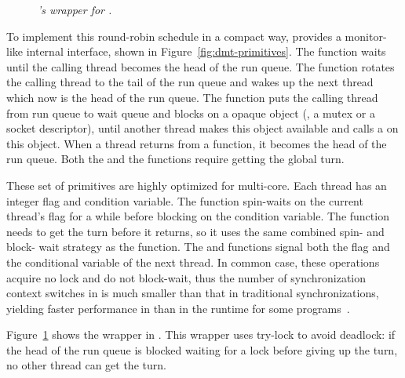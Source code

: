 \begin{figure}[t]
\centering
\begin{minipage}{.5\textwidth}
\end{minipage}
\vspace{-.1in}
\caption{{\em \parrot's wrapper for \mutexlock.}} 
\label{fig:lock}
\end{figure}

To implement this round-robin schedule in a compact way, \parrot provides a 
monitor-like internal interface, shown in Figure~\ref{fig:dmt-primitives}. The 
\getturn function waits until the calling thread becomes the head of the run 
queue. The \putturn function rotates the calling thread to the tail of the run 
queue and wakes up the next thread which now is the head of the run queue. The 
\wait function puts the calling thread from run queue to wait queue and blocks 
on a opaque object (\eg, a mutex or a socket descriptor), until another 
thread makes this object available and calls a \signal on this object. When a 
thread returns from a \wait function, it becomes the head of the run queue. 
Both the \wait and the \signal functions require getting the global turn.

These set of primitives are highly optimized for multi-core. Each thread has an 
integer flag and condition variable. The \getturn function spin-waits on the 
current thread's flag for a while before blocking on the condition variable. 
The \wait function needs to get the turn before it returns, so it uses the same 
combined spin- and block- wait strategy as the \getturn function. The \getturn 
and \signal functions signal both the flag and the conditional variable of the 
next thread. In common case, these operations acquire no lock and do not 
block-wait, thus the number of synchronization context switches in \parrot is 
much smaller than that in traditional \pthread synchronizations, yielding 
faster performance in \parrot than in the \pthread runtime for some 
programs~\cite{parrot:sosp13}.


Figure~\ref{fig:lock} shows the \mutexlock wrapper in \parrot. This wrapper 
uses try-lock to avoid deadlock: if the head of the run queue is blocked waiting 
for a lock before giving up the turn, no other thread can get the turn.

